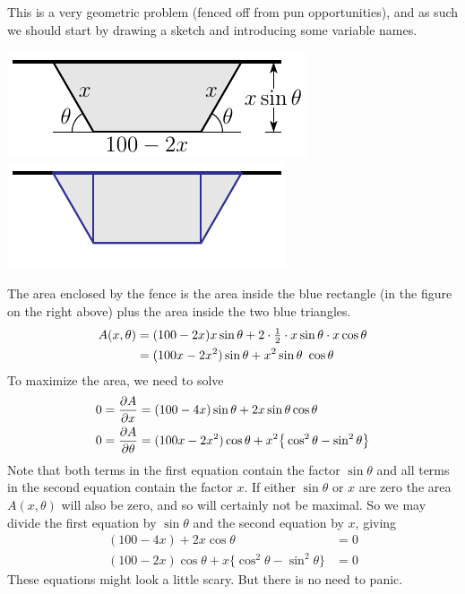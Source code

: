 \begin{eg}
\soln 
 This is a very geometric problem (fenced off from pun opportunities),
and as such we should start by drawing a sketch and introducing some 
variable names.
\begin{efig}
\begin{center}
   \includegraphics{fence.pdf}\quad 
   \includegraphics{fenceB.pdf}
\end{center}
\end{efig}
The area enclosed by the fence is the area inside the blue rectangle (in the
figure on the right above) plus the area inside the two blue triangles.
\begin{align*}
A(x,\theta)
&=(100-2x)x\sin\theta+2\cdot\tfrac{1}{2}\cdot x\sin\theta\cdot x\cos\theta  \\
&=(100x-2x^2)\sin\theta+ x^2\sin\theta\ \cos\theta  
\end{align*}
To maximize the area, we need to solve
\begin{align*}
0=\pdiff{A}{x}&=(100-4x)\sin\theta+2x\sin\theta\cos\theta \\
0=\pdiff{A}{\theta}
   &=(100x-2x^2)\cos\theta+x^2\big\{\cos^2\theta-\sin^2\theta\big\} 
\end{align*}
Note that both terms in the first equation contain the factor $\sin\theta$
and all terms in the second equation contain the factor $x$. If either
$\sin\theta$ or $x$ are zero the area $A(x,\theta)$ will also  be zero,
and so will certainly not be maximal. So we may divide the first equation
by $\sin\theta$ and the second equation by $x$, giving
\begin{align*}
(100-4x)+2x\cos\theta&=0 \tag{E1}\\
(100-2x)\cos\theta+x\big\{\cos^2\theta-\sin^2\theta\big\}&=0 \tag{E2}
\end{align*}
These equations might look a little scary. But there is no need to panic.

\end{eg}

